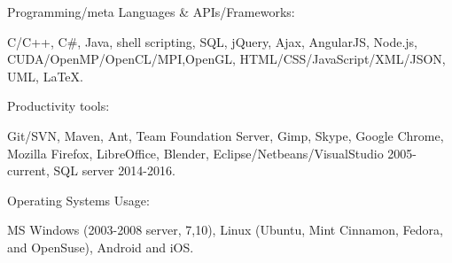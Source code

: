 \begin{cventries}

  \cventry
    {Programming/meta Languages \& APIs/Frameworks:} %
    {} %
    {} %
    {} %
    { 
      \begin{cvitems} %
        \item {C/C++, C\#, Java, shell scripting, SQL, jQuery, Ajax, AngularJS, Node.js, CUDA/OpenMP/OpenCL/MPI,OpenGL, HTML/CSS/JavaScript/XML/JSON, UML, LaTeX.}
	  \end{cvitems}
    }  
  \vspace{-0.4cm}

  \cventry
    {Productivity tools:} %
    {} %
    {} %
    {} %
    {
      \begin{cvitems} %
        \item {Git/SVN, Maven, Ant, Team Foundation Server, Gimp, Skype, Google Chrome, Mozilla Firefox, LibreOffice, Blender, Eclipse/Netbeans/VisualStudio 2005-current, SQL server 2014-2016.}%
      \end{cvitems}
    }  
  \vspace{-0.4cm}  
    
%    
%    
  \cventry
    {Operating Systems Usage:} %
    {} 
    {} 
    {} 
    {
      \begin{cvitems} %
        \item {MS Windows (2003-2008 server, 7,10), Linux (Ubuntu, Mint Cinnamon, Fedora, and OpenSuse), Android and iOS.}        
      \end{cvitems}
    }  
  \vspace{0.4cm} 
    

\end{cventries}